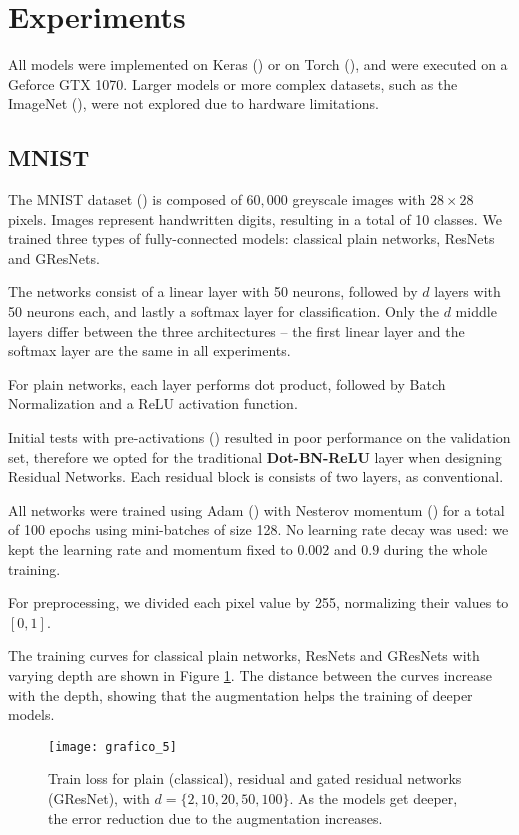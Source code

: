 \documentclass{article} \RequirePackage{amsmath,amsthm,amsfonts,amssymb}
\begin{document}
\section{Experiments}

All models were implemented on Keras (\cite{keras}) or on Torch (\cite{t7}), and were executed on a Geforce GTX 1070. Larger models or more complex datasets, such as the ImageNet (\cite{imagenet}), were not explored due to hardware limitations.

\subsection{MNIST}

The MNIST dataset (\cite{mnist}) is composed of $60,000$ greyscale images with $28 \times 28$ pixels. Images represent handwritten digits, resulting in a total of 10 classes. We trained three types of fully-connected models: classical plain networks, ResNets and GResNets.

The networks consist of a linear layer with 50 neurons, followed by $d$ layers with 50 neurons each, and lastly a softmax layer for classification. Only the $d$ middle layers differ between the three architectures -- the first linear layer and the softmax layer are the same in all experiments.

For plain networks, each layer performs dot product, followed by Batch Normalization and a ReLU activation function.

Initial tests with pre-activations (\cite{resnet2}) resulted in poor performance on the validation set, therefore we opted for the traditional \textbf{Dot-BN-ReLU} layer when designing Residual Networks. Each residual block is consists of two layers, as conventional.

All networks were trained using Adam (\cite{adam}) with Nesterov momentum (\cite{adamnest}) for a total of 100 epochs using mini-batches of size 128. No learning rate decay was used: we kept the learning rate and momentum fixed to $0.002$ and $0.9$ during the whole training.

For preprocessing, we divided each pixel value by 255, normalizing their values to $[0,1]$.

The training curves for classical plain networks, ResNets and GResNets with varying depth are shown in Figure \ref{mnist_loss}. The distance between the curves increase with the depth, showing that the augmentation helps the training of deeper models.

\begin{figure}[!ht]
  \centering
    \texttt{[image: grafico\_5]}
  \caption{Train loss for plain (classical), residual and gated residual networks (GResNet), with $d = \{2,10,20,50,100\}$. As the models get deeper, the error reduction due to the augmentation increases.}
\label{mnist_loss}
\end{figure}
\end{document}

